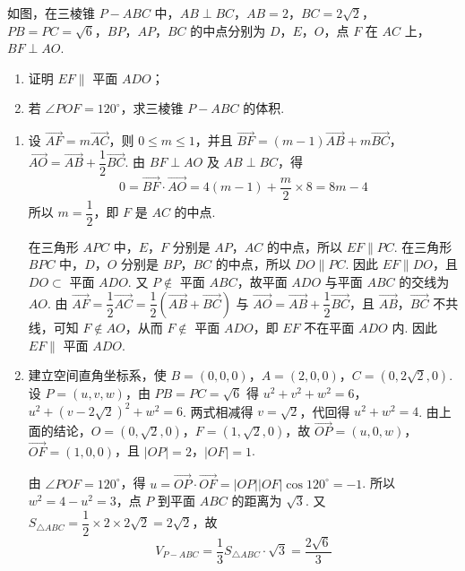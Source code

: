 \begin{problem}
如图，在三棱锥 \(P-ABC\) 中，\(AB\perp BC\)，\(AB=2\)，\(BC=2\sqrt2\)，\(PB=PC=\sqrt6\)，\(BP\)，\(AP\)，\(BC\) 的中点分别为 \(D\)，\(E\)，\(O\)，点 \(F\) 在 \(AC\) 上，\(BF\perp AO\).
\begin{enumerate}
\item 证明 \(EF\parallel\) 平面 \(ADO\)；
\item 若 \(\angle POF=120^\circ\)，求三棱锥 \(P-ABC\) 的体积.
\end{enumerate}

\begin{solution}
\begin{enumerate}
\item 设 \(\overrightarrow{AF}=m\overrightarrow{AC}\)，则 \(0\le m\le1\)，并且
\(\overrightarrow{BF}=(m-1)\overrightarrow{AB}+m\overrightarrow{BC}\)，\(\overrightarrow{AO}=\overrightarrow{AB}+\dfrac12\overrightarrow{BC}\). 由 \(BF\perp AO\) 及 \(AB\perp BC\)，得
\[
0=\overrightarrow{BF}\cdot\overrightarrow{AO}=4(m-1)+\frac{m}{2}\times8=8m-4
\]
所以 \(m=\dfrac12\)，即 \(F\) 是 \(AC\) 的中点.

在三角形 \(APC\) 中，\(E\)，\(F\) 分别是 \(AP\)，\(AC\) 的中点，所以 \(EF\parallel PC\). 在三角形 \(BPC\) 中，\(D\)，\(O\) 分别是 \(BP\)，\(BC\) 的中点，所以 \(DO\parallel PC\). 因此 \(EF\parallel DO\)，且 \(DO\subset\) 平面 \(ADO\).
又 \(P\notin\) 平面 \(ABC\)，故平面 \(ADO\) 与平面 \(ABC\) 的交线为 \(AO\). 由
\(\overrightarrow{AF}=\dfrac12\overrightarrow{AC}=\dfrac12\left(\overrightarrow{AB}+\overrightarrow{BC}\right)\) 与
\(\overrightarrow{AO}=\overrightarrow{AB}+\dfrac12\overrightarrow{BC}\)，且 \(\overrightarrow{AB}\)，\(\overrightarrow{BC}\) 不共线，可知 \(F\notin AO\)，从而 \(F\notin\) 平面 \(ADO\)，即 \(EF\) 不在平面 \(ADO\) 内. 因此 \(EF\parallel\) 平面 \(ADO\).
\item 建立空间直角坐标系，使 \(B=(0,0,0)\)，\(A=(2,0,0)\)，\(C=(0,2\sqrt2,0)\). 设 \(P=(u,v,w)\)，由 \(PB=PC=\sqrt6\) 得
\(u^2+v^2+w^2=6\)，\(u^2+(v-2\sqrt2)^2+w^2=6\).
两式相减得 \(v=\sqrt2\)，代回得 \(u^2+w^2=4\). 由上面的结论，\(O=(0,\sqrt2,0)\)，\(F=(1,\sqrt2,0)\)，故 \(\overrightarrow{OP}=(u,0,w)\)，\(\overrightarrow{OF}=(1,0,0)\)，且 \(|OP|=2\)，\(|OF|=1\).

由 \(\angle POF=120^\circ\)，得 \(u=\overrightarrow{OP}\cdot\overrightarrow{OF}=|OP||OF|\cos120^\circ=-1\). 所以 \(w^2=4-u^2=3\)，点 \(P\) 到平面 \(ABC\) 的距离为 \(\sqrt3\). 又 \(S_{\triangle ABC}=\dfrac12\times2\times2\sqrt2=2\sqrt2\)，故
\[
V_{P-ABC}=\frac13S_{\triangle ABC}\cdot\sqrt3=\frac{2\sqrt6}{3}
\]
\end{enumerate}
\end{solution}
\end{problem}

